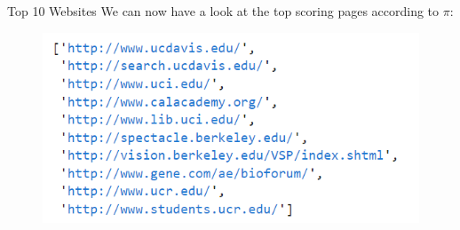 \documentclass[10pt]{beamer}
\begin{document}
\begin{frame}{Top 10 Websites}
We can now have a look at the top scoring pages according to $\pi$:
\begin{center}
\begin{figure}[h] 
\centering 
\includegraphics[scale=.8]{top10}
\end{figure}
\end{center}


\end{frame}
\end{document}
